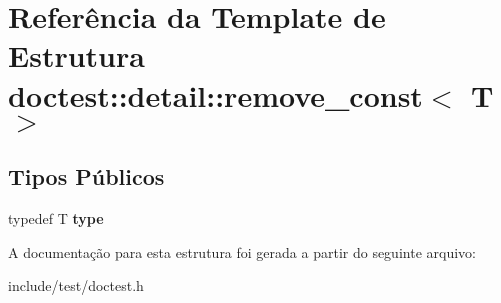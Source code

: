 \hypertarget{structdoctest_1_1detail_1_1remove__const}{}\section{Referência da Template de Estrutura doctest\+:\+:detail\+:\+:remove\+\_\+const$<$ T $>$}
\label{structdoctest_1_1detail_1_1remove__const}
\subsection*{Tipos Públicos}
\begin{DoxyCompactItemize}
\item 
\mbox{\label{structdoctest_1_1detail_1_1remove__const_ad6a97a5d2fcb5f513bbff8ea12e280f8}} 
typedef T {\bfseries type}
\end{DoxyCompactItemize}


A documentação para esta estrutura foi gerada a partir do seguinte arquivo\+:\begin{DoxyCompactItemize}
\item 
include/test/doctest.\+h\end{DoxyCompactItemize}
